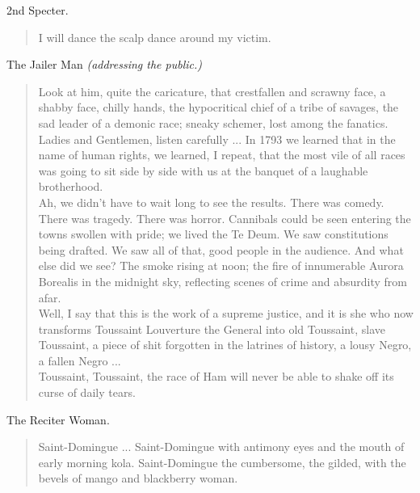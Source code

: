 \documentclass[letterpaper,article,12pt,oneside,notitlepage]{memoir}
\begin{document}
\begin{center}2nd Specter.\end{center}

\begin{verse}
I will dance the scalp dance around my victim. \\
\end{verse}

\begin{center}The Jailer Man \textit{(addressing the public.)}\end{center}

\begin{verse}
Look at him, quite the caricature, that crestfallen and scrawny face, a shabby face, chilly hands, the hypocritical chief of a tribe of savages, the sad leader of a demonic race; sneaky schemer, lost among the fanatics. \\
\indent Ladies and Gentlemen, listen carefully ... In 1793 we learned that in the name of human rights, we learned, I repeat, that the most vile of all races was going to sit side by side with us at the banquet of a laughable brotherhood. \\
\indent Ah, we didn't have to wait long to see the results. There was comedy. There was tragedy. There was horror. Cannibals could be seen entering the towns swollen with pride; we lived the Te Deum. We saw constitutions being drafted. We saw all of that, good people in the audience. And what else did we see? The smoke rising at noon; the fire of innumerable Aurora Borealis in the midnight sky, reflecting scenes of crime and absurdity from afar. \\
\indent Well, I say that this is the work of a supreme justice, and it is she who now transforms Toussaint Louverture the General into old Toussaint, slave Toussaint, a piece of shit forgotten in the latrines of history, a lousy Negro, a fallen Negro ... \\
\indent Toussaint, Toussaint, the race of Ham will never be able to shake off its curse of daily tears. \\
\end{verse}

\begin{center}The Reciter Woman.\end{center}

\begin{verse}
\indent Saint-Domingue ... Saint-Domingue with antimony eyes and the mouth of early morning kola. Saint-Domingue the cumbersome, the gilded, with the bevels of mango and blackberry woman. \\
\end{verse}
\end{document}
